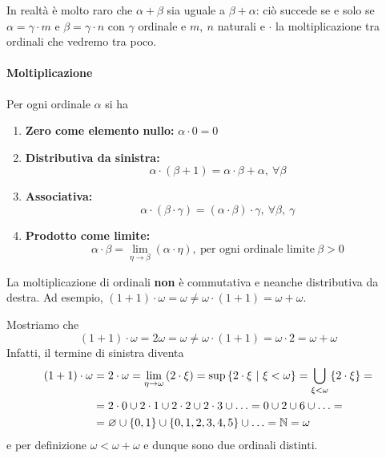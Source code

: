 In realtà è molto raro che $\alpha+\beta$ sia uguale a $\beta+\alpha$: ciò succede se e solo se $\alpha=\gamma \cdot m$ e $\beta=\gamma \cdot n$ con $\gamma$ ordinale e $m,\ n$ naturali e $\cdot$ la moltiplicazione tra ordinali che vedremo tra poco.
\paragraph{Moltiplicazione}
\begin{define}
	Per ogni ordinale $\alpha$ si ha
	\begin{enumerate}
		\item \textbf{Zero come elemento nullo:}
		$\alpha\cdot0=0$
		\item \textbf{Distributiva da sinistra:}
		\begin{equation*}
			\alpha\cdot\left(\beta+1\right)=\alpha\cdot\beta+\alpha,\ \forall \beta
		\end{equation*}
		\item \textbf{Associativa:}
		\begin{equation*}
			\alpha\cdot\left(\beta\cdot\gamma\right)=\left(\alpha\cdot\beta\right)\cdot\gamma,\ \forall \beta,\ \gamma
		\end{equation*}
		\item \textbf{Prodotto come limite:}
		\begin{equation*}
			\alpha\cdot\beta=\lim_{\eta\to\beta}\left(\alpha\cdot\eta\right),\ \text{per ogni ordinale limite}\ \beta>0
		\end{equation*}
	\end{enumerate}
\end{define}
\begin{attention}
	La moltiplicazione di ordinali \textbf{non} è commutativa e neanche distributiva da destra. Ad esempio, $\left(1+1\right)\cdot\omega=\omega\neq\omega\cdot\left(1+1\right)=\omega+\omega$.
\end{attention}
\begin{examplewt}
	Mostriamo che
	\begin{equation*}
		\left(1+1\right)\cdot\omega=2\omega=\omega\neq\omega\cdot\left(1+1\right)=\omega\cdot 2=\omega+\omega
	\end{equation*}
	Infatti, il termine di sinistra diventa
	\begin{align*}
		\left(1+1\right)\cdot\omega&=2\cdot\omega=\lim_{\eta\to \omega}\left(2\cdot\xi\right)=\sup\left\{2\cdot\xi \ \middle| \ \xi<\omega\right\}=\bigcup_{\xi<\omega}\left\{2\cdot\xi\right\}=\\
		&=2\cdot 0\cup2\cdot 1\cup 2\cdot2\cup 2\cdot3\cup \ldots=0\cup 2\cup 6\cup\ldots=\\
		&=\emptyset\cup\{0,1\}\cup\{0,1,2,3,4,5\}\cup\ldots=\naturalset=\omega
	\end{align*}
	e per definizione $\omega<\omega+\omega$ e dunque sono due ordinali distinti.
\end{examplewt}
